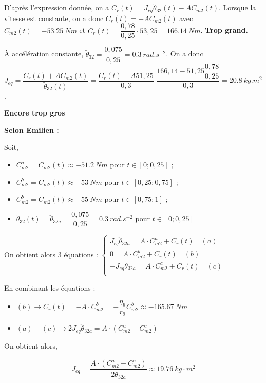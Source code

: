 \documentclass[10pt,fleqn]{article} %
\begin{document}
\subparagraph{}%
D'après l'expression donnée, on a $C_r(t)=J_{eq}\ddot{\theta}_{32}(t)-A C_{m2}(t)$.
Lorsque la vitesse est constante, on a donc $C_r(t)=-A C_{m2}(t)$ avec $C_{m2}(t)=-\SI{53,25}{Nm}$ et 
$C_r(t)= \dfrac{0,78}{0,25} \cdot  53,25  = \SI{166,14}{Nm}$.   \textbf{Trop grand.}


À accélération constante, $\ddot{\theta}_{32} = \dfrac{0,075}{0,25}=\SI{0,3}{rad.s^{-2}}$. On a donc 
$J_{eq}=\dfrac{C_r(t)+A C_{m2}(t)}{\ddot{\theta}_{32}(t)}=\dfrac{C_r(t)-A 51,25}{0,3}$ 
$\dfrac{166,14  -51,25\dfrac{0,78}{0,25}}{0,3}=\SI{20,8}{kg.m^2}$. 


\textbf{Encore trop gros}

\textbf{Selon Emilien :}

Soit,
\begin{itemize}
\item $C^{a}_{m2}=C_{m2}(t)\approx-\SI{51,2}{Nm}$ pour $t\in\left[0;0,25\right]$ ;
\item $C^{b}_{m2}=C_{m2}(t)\approx-\SI{53}{Nm}$ pour $t\in\left[0,25;0,75\right]$ ;
\item $C^{b}_{m2}=C_{m2}(t)\approx-\SI{55}{Nm}$ pour $t\in\left[0,75;1\right]$ ;
\item $\ddot{\theta}_{32}(t)=\ddot{\theta}_{32a}=\dfrac{0,075}{0,25}=\SI{0,3}{rad. s^{-2}}$ pour $t\in \left[0;0,25\right]$
\end{itemize}

On obtient alors 3 équations : 
$
\left\{
\begin{array}{l}
J_{eq}\ddot{\theta}_{32a}=A\cdot C^{a}_{m2}+C_r(t) \quad (a)\\
0=A\cdot C^{b}_{m2}+C_r(t)  \quad (b)\\
-J_{eq}\ddot{\theta}_{32a}=A\cdot C^{c}_{m2}+C_r(t)  \quad (c)\\
\end{array}
\right.
$

En combinant les équations : 
\begin{itemize}
\item $(b) \rightarrow C_r(t)=-A\cdot  C^{b}_{m2}=-\dfrac{\eta_9}{r_9}C^{b}_{m2}\approx \SI{-165.67}{Nm}$
\item $(a)-(c)\rightarrow 2 J_{eq} \ddot{\theta}_{32a}=A\cdot \left(C^{a}_{m2}-C^{c}_{m2}\right)$
\end{itemize}

On obtient alors,

\begin{align*}
J_{eq}=\dfrac{A\cdot \left(C^{a}_{m2}-C^{c}_{m2}\right)}{2\ddot{\theta}_{32a}} \approx \SI{19,76}{kg}\cdot m^2
\end{align*}
\end{document}
